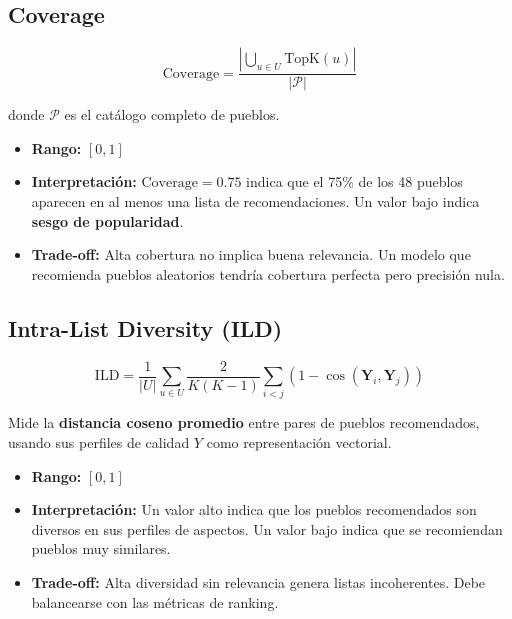 \documentclass[11pt, a4paper]{article}
\begin{document}
\subsection{Coverage}

\begin{equation}
    \text{Coverage} = \frac{\left|\bigcup_{u \in U} \text{TopK}(u)\right|}{|\mathcal{P}|}
\end{equation}

donde $\mathcal{P}$ es el catálogo completo de pueblos.

\begin{itemize}
    \item \textbf{Rango:} $[0, 1]$
    \item \textbf{Interpretación:} $\text{Coverage} = 0.75$ indica que el 75\% de los 48 pueblos aparecen en al menos una lista de recomendaciones. Un valor bajo indica \textbf{sesgo de popularidad}.
    \item \textbf{Trade-off:} Alta cobertura no implica buena relevancia. Un modelo que recomienda pueblos aleatorios tendría cobertura perfecta pero precisión nula.
\end{itemize}

\subsection{Intra-List Diversity (ILD)}

\begin{equation}
    \text{ILD} = \frac{1}{|U|} \sum_{u \in U} \frac{2}{K(K-1)} \sum_{i < j} \left(1 - \cos(\mathbf{Y}_i, \mathbf{Y}_j)\right)
\end{equation}

Mide la \textbf{distancia coseno promedio} entre pares de pueblos recomendados, usando sus perfiles de calidad $Y$ como representación vectorial.

\begin{itemize}
    \item \textbf{Rango:} $[0, 1]$
    \item \textbf{Interpretación:} Un valor alto indica que los pueblos recomendados son diversos en sus perfiles de aspectos. Un valor bajo indica que se recomiendan pueblos muy similares.
    \item \textbf{Trade-off:} Alta diversidad sin relevancia genera listas incoherentes. Debe balancearse con las métricas de ranking.
\end{itemize}
\end{document}
